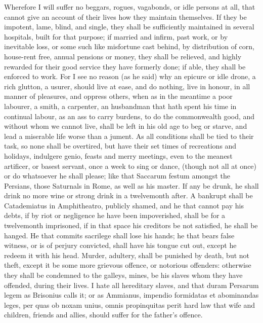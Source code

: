 {Wherefore I will suffer no beggars, rogues, vagabonds, or idle
persons at all, that cannot give an account of their lives how they
maintain themselves. If they be impotent, lame, blind, and single,
they shall be sufficiently maintained in several hospitals, built for
that purpose; if married and infirm, past work, or by inevitable loss,
or some such like misfortune cast behind, by distribution of corn,
house-rent free, annual pensions or money, they shall be relieved, and
highly rewarded for their good service they have formerly done; if
able, they shall be enforced to work. For I see no reason (as
he said) why an epicure or idle drone, a rich glutton, a usurer,
should live at ease, and do nothing, live in honour, in all manner of
pleasures, and oppress others, when as in the meantime a poor labourer,
a smith, a carpenter, an husbandman that hath spent his time in
continual labour, as an ass to carry burdens, to do the commonwealth
good, and without whom we cannot live, shall be left in his old age to
beg or starve, and lead a miserable life worse than a jument. As
all conditions shall be tied to their task, so none shall be
overtired, but have their set times of recreations and holidays,
indulgere genio, feasts and merry meetings, even to the meanest
artificer, or basest servant, once a week to sing or dance, (though not
all at once) or do whatsoever he shall please; like that Saccarum
festum amongst the Persians, those Saturnals in Rome, as well as his
master. If any be drunk, he shall drink no more wine or strong
drink in a twelvemonth after. A bankrupt shall be  Catademiatus in
Amphitheatro, publicly shamed, and he that cannot pay his debts, if by
riot or negligence he have been impoverished, shall be for a
twelvemonth imprisoned, if in that space his creditors be not
satisfied, he shall be hanged. He that commits sacrilege
shall lose his hands; he that bears false witness, or is of perjury
convicted, shall have his tongue cut out, except he redeem it with his
head. Murder,  adultery, shall be punished by death, but not
theft, except it be some more grievous offence, or notorious offenders:
otherwise they shall be condemned to the galleys, mines, be his slaves
whom they have offended, during their lives. I hate all hereditary
slaves, and that duram Persarum legem as Brisonius calls it; or as
Ammianus, impendio formidatas et abominandas leges, per quas ob
noxam unius, omnis propinquitas perit hard law that wife and children,
friends and allies, should suffer for the father's offence.

}
